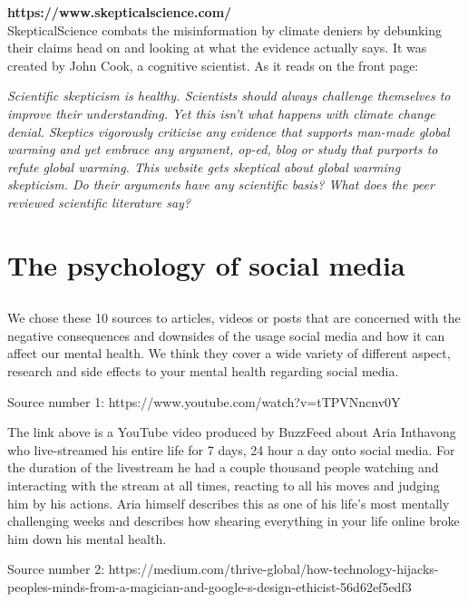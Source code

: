 \documentclass[11pt]{article}
\begin{document}
\textbf{https://www.skepticalscience.com/}\\
SkepticalScience combats the misinformation by climate deniers by debunking their
claims head on and looking at what the evidence actually says. It was created by
John Cook, a cognitive scientist. As it reads on the front page:

\begin{displayquote}
\textit{Scientific skepticism is healthy. Scientists should always challenge themselves to
improve their understanding. Yet this isn't what happens with climate change denial.
Skeptics vigorously criticise any evidence that supports man-made global warming and
yet embrace any argument, op-ed, blog or study that purports to refute global warming.
This website gets skeptical about global warming skepticism. Do their arguments have
any scientific basis? What does the peer reviewed scientific literature say?}
\end{displayquote}

\section{The psychology of social media}

\subsection{}

We chose these 10 sources to articles, videos or posts that are concerned with the negative consequences and downsides of the usage social media and how it can affect our mental health. We think they cover a wide variety of different aspect, research and side effects to your mental health regarding social media. 
	
Source number 1: 
https://www.youtube.com/watch?v=tTPVNncnv0Y

The link above is a YouTube video produced by BuzzFeed about Aria Inthavong who live-streamed his entire life for 7 days, 24 hour a day onto social media. For the duration of the livestream he had a couple thousand people watching and interacting with the stream at all times, reacting to all his moves and judging him by his actions. Aria himself describes this as one of his life's most mentally challenging weeks and describes how shearing everything in your life online broke him down his mental health.

Source number 2: https://medium.com/thrive-global/how-technology-hijacks-peoples-minds-from-a-magician-and-google-s-design-ethicist-56d62ef5edf3
\end{document}
